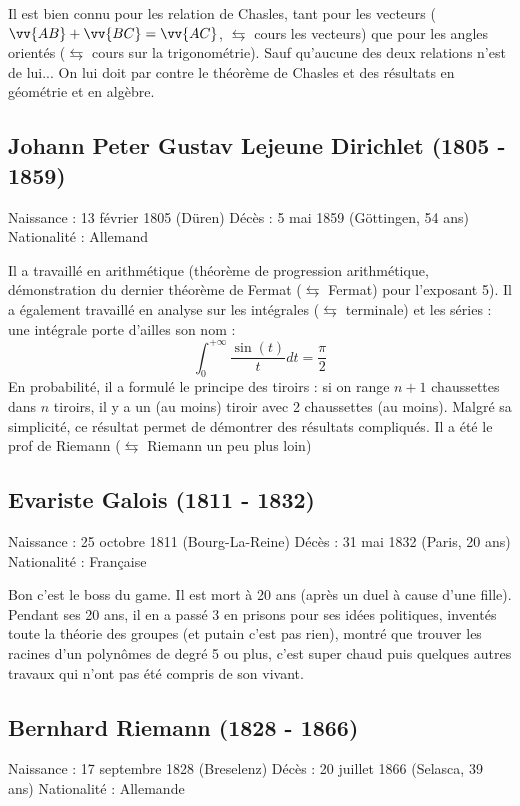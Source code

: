 Il est bien connu pour les relation de Chasles, tant pour les vecteurs ($\vv{AB} + \vv{BC} = \vv{AC}$, $\leftrightarrows$ cours les vecteurs) que pour les angles orientés ($\leftrightarrows$ cours sur la trigonométrie). Sauf qu'aucune des deux relations n'est de lui... On lui doit par contre le théorème de Chasles et des résultats en géométrie et en algèbre.

\subsection*{Johann Peter Gustav Lejeune Dirichlet (1805 - 1859)}
Naissance : 13 février 1805 (Düren)\newline
Décès : 5 mai 1859 (Göttingen, 54 ans)\newline
Nationalité : Allemand\newline

Il a travaillé en arithmétique (théorème de progression arithmétique, démonstration du dernier théorème de Fermat ($\leftrightarrows$ Fermat) pour l'exposant 5). Il a également travaillé en analyse sur les intégrales ($\leftrightarrows$ terminale) et les séries : une intégrale porte d'ailles son nom : 
$$\int_0^{+\infty}\dfrac{\sin(t)}{t}dt = \dfrac{\pi}{2}$$
En probabilité, il a formulé le principe des tiroirs : si on range $n+1$ chaussettes dans $n$ tiroirs, il y a un (au moins) tiroir avec 2 chaussettes (au moins). Malgré sa simplicité, ce résultat permet de démontrer des résultats compliqués. Il a été le prof de Riemann ($\leftrightarrows$ Riemann un peu plus loin)

\subsection*{Evariste Galois (1811 - 1832)}
Naissance : 25 octobre 1811 (Bourg-La-Reine)\newline
Décès : 31 mai 1832 (Paris, 20 ans)\newline
Nationalité : Française\newline

Bon c'est le boss du game. Il est mort à 20 ans (après un duel à cause d'une fille). Pendant ses 20 ans, il en a passé 3 en prisons pour ses idées politiques, inventés toute la théorie des groupes (et putain c'est pas rien), montré que trouver les racines d'un polynômes de degré 5 ou plus, c'est super chaud puis quelques autres travaux qui n'ont pas été compris de son vivant. 

\subsection*{Bernhard Riemann (1828 - 1866)}
Naissance : 17 septembre 1828 (Breselenz)\newline
Décès : 20 juillet 1866 (Selasca, 39 ans)\newline
Nationalité : Allemande\newline

